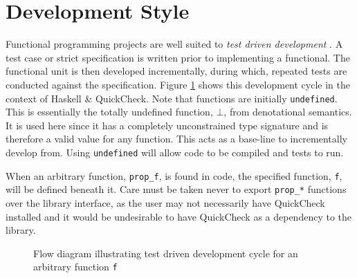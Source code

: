 \section{Development Style}
Functional programming projects are well suited to \textit{test driven development} \cite{beck03}. A test case or strict specification is written prior to implementing a functional. The functional unit is then developed incrementally, during which, repeated tests are conducted against the specification. Figure \ref{fig:tdd} shows this development cycle in the context of {Haskell} \& {QuickCheck}. Note that functions are initially \texttt{undefined}. This is essentially the totally undefined function, $\bot$, from denotational semantics. It is used here since it has a completely unconstrained type signature and is therefore a valid value for any function. This acts as a base-line to incrementally develop from. Using \texttt{undefined} will allow code to be compiled and tests to run.

When an arbitrary function, \verb|prop_f|, is found in code, the specified function, \verb|f|, will be defined beneath it. Care must be taken never to export \verb|prop_*| functions over the library interface, as the user may not necessarily have {QuickCheck} installed and it would be undesirable to have {QuickCheck} as a dependency to the library.

\begin{figure}[]
\centering
\scalebox{1}{}

\caption{Flow diagram illustrating {test driven development} cycle for an arbitrary function \texttt{f}\label{fig:tdd}}
\end{figure}